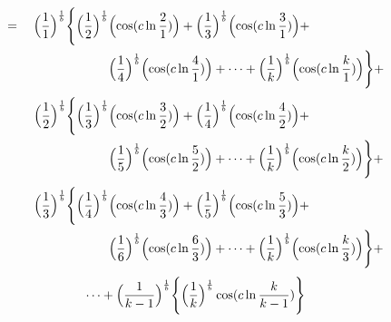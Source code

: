 \documentclass{amsart}
\begin{document}
	\[
	\begin{aligned}
		= \quad \Bigl( \frac{1}{1} \Bigr)^\frac1b \Biggl\{ \Bigl( \frac{1}{2} \Bigr)^\frac1b & \Bigl( \cos(c \ln \frac{2}{1}) \Bigr) + \Bigl( \frac{1}{3} \Bigr)^\frac1b \Bigl( \cos(c \ln \frac{3}{1}) \Bigr) + \\
		& \Bigl( \frac{1}{4} \Bigr)^\frac1b \Bigl( \cos(c \ln \frac{4}{1}) \Bigr) + \dots  + \Bigl( \frac{1}{k} \Bigr)^\frac1b \Bigl( \cos(c \ln \frac{k}{1}) \Bigr) \Biggr\} + 
	\end{aligned}
	\]
	\[
	\begin{aligned}
		\quad\quad \Bigl( \frac{1}{2}  \Bigr)^\frac1b \Biggl\{ \Bigl( \frac{1}{3} \Bigr)^\frac1b & \Bigl( \cos(c \ln \frac{3}{2}) \Bigr) + \Bigl( \frac{1}{4} \Bigr)^\frac1b \Bigl( \cos(c \ln \frac{4}{2}) \Bigr) + \\
		& \Bigl( \frac{1}{5} \Bigr)^\frac1b \Bigl( \cos(c \ln \frac{5}{2}) \Bigr) + \dots  + \Bigl( \frac{1}{k} \Bigr)^\frac1b \Bigl( \cos(c \ln \frac{k}{2}) \Bigr) \Biggr\} + 
	\end{aligned}
	\]
	\[
	\begin{aligned}
		\quad\quad \Bigl( \frac{1}{3} \Bigr)^\frac1b \Biggl\{ \Bigl( \frac{1}{4} \Bigr)^\frac1b & \Bigl( \cos(c \ln \frac{4}{3}) \Bigr) + \Bigl( \frac{1}{5} \Bigr)^\frac1b \Bigl( \cos(c \ln \frac{5}{3}) \Bigr) + \\
		& \Bigl( \frac{1}{6} \Bigr)^\frac1b \Bigl( \cos(c \ln \frac{6}{3}) \Bigr) + \dots  + \Bigl( \frac{1}{k} \Bigr)^\frac1b \Bigl( \cos(c \ln \frac{k}{3}) \Bigr) \Biggr\} + 
	\end{aligned}
	\]
	\[ \dots + \Bigl( \frac{1}{k-1} \Bigr)^\frac1b \Biggl\{ \Bigl( \frac{1}{k} \Bigr)^\frac1b \cos(c \ln \frac{k}{k-1}) \Biggr\} \]
	
\end{document}
